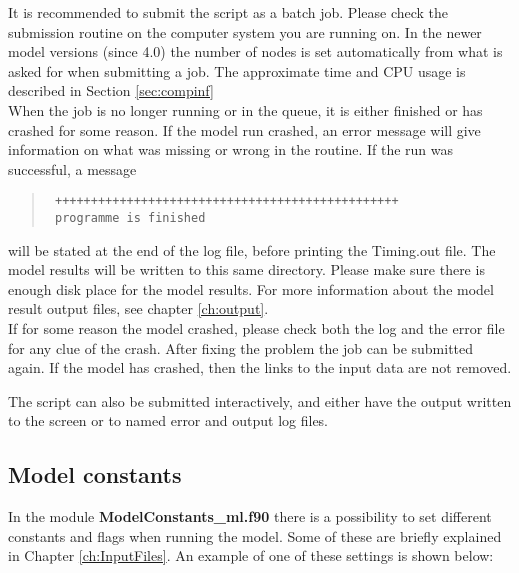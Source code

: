 It is recommended to submit the script as a batch job. Please check the 
submission routine on the computer system you are running on. 
In the newer model versions (since 4.0) the number of nodes is set 
automatically from what is asked for when submitting a job. 
The approximate time and CPU usage is described in Section \ref{sec:compinf}\\

When the job is no longer running or in the queue, it is either finished or has crashed for some reason.  
If the model run crashed, an error message will give information on what was missing or wrong in the routine.  
If the run was successful, a message
\begin{quote}
\begin{verbatim}
 ++++++++++++++++++++++++++++++++++++++++++++++++
 programme is finished
\end{verbatim}
\end{quote}
will be stated at the end of the log file, before printing the Timing.out file.   
The model results will be written to this same directory. Please make 
sure there is enough disk place for the model results. 
For more information about the model result output files, see chapter \ref{ch:output}.\\

If for some reason the model crashed, please check both the log and the error 
file for any clue of the crash. After fixing the problem the job can be 
submitted again. If the model has crashed, then the links to the input data 
are not removed. 

The script can also be submitted interactively, and either have the output 
written to the screen or to named error and output log files. 
 

\subsection{Model constants}

In the module {\bf ModelConstants\_ml.f90 } there is a possibility to set 
different constants and flags when running the model. 
Some of these are briefly explained in Chapter \ref{ch:InputFiles}. 
An example of one of these settings is shown below:

